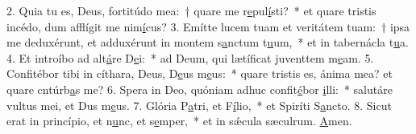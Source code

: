 2. Quia tu es, Deus, fortitúdo mea:~† quare me r\uline{e}pul\uline{í}sti?~* et quare tristis incédo, dum afflígit me nim\uline{í}cus?
3. Emítte lucem tuam et veritátem tuam:~† ipsa me deduxérunt, et adduxérunt in montem s\uline{a}nctum t\uline{u}um,~* et in tabernácla t\uline{u}a.
4. Et introíbo ad alt\uline{á}re D\uline{e}i:~* ad Deum, qui lætíficat juventtem m\uline{e}am.
5. Confitébor tibi in cíthara, Deus, D\uline{e}us m\uline{e}us:~* quare tristis es, ánima mea? et quare cntúrb\uline{a}s me?
6. Spera in Deo, quóniam adhuc confit\uline{é}bor \uline{i}lli:~* salutáre vultus mei, et Dus m\uline{e}us.
7. Glória P\uline{a}tri, et F\uline{í}lio,~* et Spiríti S\uline{a}ncto.
8. Sicut erat in princípio, et n\uline{u}nc, et s\uline{e}mper,~* et in sǽcula sæculrum. \uline{A}men.
